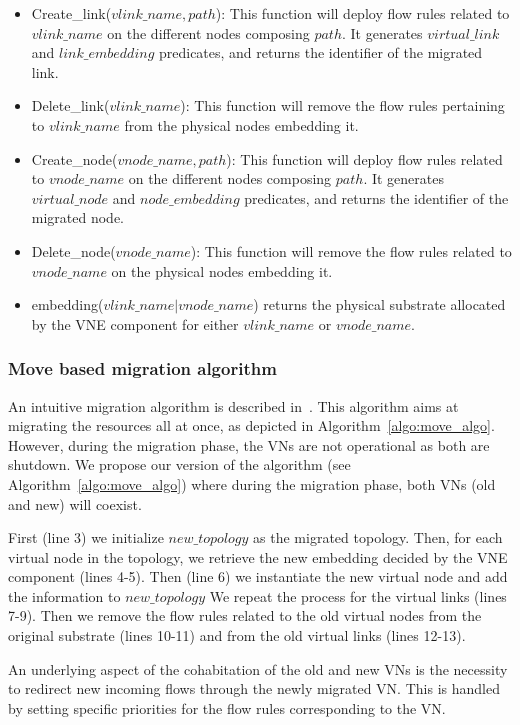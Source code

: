 \begin{itemize}
\item Create\_link($vlink\_name,path$): This function will deploy flow rules related to $vlink\_name$ on the different nodes composing $path$. It generates $virtual\_link$ and $link\_embedding$ predicates, and returns the identifier of the migrated link.
\item Delete\_link($vlink\_name$): This function will remove the flow rules pertaining to $vlink\_name$ from the physical nodes embedding it.
\item Create\_node($vnode\_name,path$): This function will deploy flow rules related to $vnode\_name$ on the different nodes composing $path$. It generates $virtual\_node$ and $node\_embedding$ predicates, and returns the identifier of the migrated node.
\item Delete\_node($vnode\_name$): This function will remove the flow rules related to  $vnode\_name$ on the physical nodes embedding it.
\item embedding($vlink\_name|vnode\_name$) returns the physical substrate allocated by the VNE component for either $vlink\_name$ or $vnode\_name$.
\end{itemize}

\subsubsection{Move based migration algorithm}
\label{sec:move-algo}

An intuitive migration algorithm is described in~\cite{Lime-Ghorbani2014}. 
This algorithm aims at migrating the resources all at once, as depicted in Algorithm~\ref{algo:move_algo}.
However, during the migration phase, the VNs are not operational as both are shutdown.
We propose our version of the algorithm (see Algorithm~\ref{algo:move_algo}) where during the migration phase, both VNs (old and new) will coexist.

First (line 3) we initialize $new\_topology$ as the migrated topology. Then, for each virtual node in the topology, we retrieve the new embedding decided by the VNE component (lines 4-5).
Then (line 6) we instantiate the new virtual node and add the information to $new\_topology$
We repeat the process for the virtual links (lines 7-9).
Then we remove the flow rules related to the old virtual nodes from the original substrate (lines 10-11) and from the old virtual links (lines 12-13).

An underlying aspect of the cohabitation of the old and new VNs is the necessity to redirect new incoming flows through the newly migrated VN.
This is handled by setting specific priorities for the flow rules corresponding to the VN.


